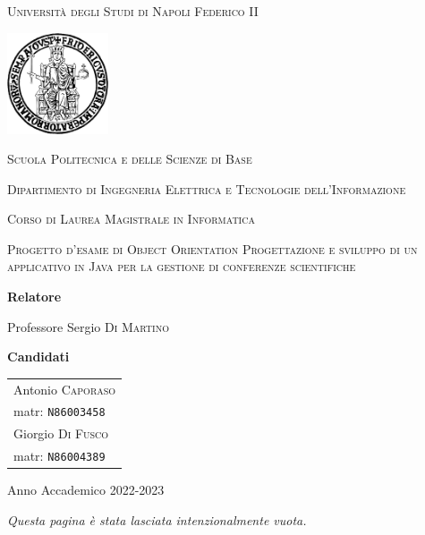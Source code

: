 \documentclass[a4paper, oneside, 10pt]{book}
\begin{document}
\pagestyle{empty}
\begin{titlepage}
	\begin{center}
		\setlength{\parskip}{2ex}
		
		
		\Large\textsc{Università degli Studi di Napoli Federico II}
		
		\includegraphics[width=3cm]{Immagini/logo-federico-II.pdf}
		
		\Large\textsc{Scuola Politecnica e delle Scienze di Base}
		
		\large\textsc{Dipartimento di Ingegneria Elettrica e Tecnologie dell'Informazione}
		
		\large\textsc{Corso di Laurea Magistrale in Informatica}
		
		\textsc{Progetto d'esame di Object Orientation}
		\vfill
		\huge\textsc{Progettazione e sviluppo di un applicativo in Java per la gestione di conferenze scientifiche}
		\vfill
		\begin{minipage}[t]{.49\textwidth}
			\large
			
			\textbf{Relatore}\par
			Professore Sergio \textsc{Di Martino}
		\end{minipage}\hfill
	\begin{minipage}[t]{.45\textwidth}
		\large
		\hspace{3.3cm}\textbf{Candidati}\par
		\hfill\begin{tabular}{l}
			 Antonio \textsc{Caporaso} \\ 
			 matr: \texttt{N86003458} \\
			 Giorgio \textsc{Di Fusco} \\
			  matr: \texttt{N86004389} \\
		 \end{tabular}
	\end{minipage}
\vfill
		
		\large Anno Accademico 2022-2023
	\end{center}
\end{titlepage}

\newpage
\textit{Questa pagina è stata lasciata intenzionalmente vuota.}
\newpage
\tableofcontents
\listoffigures
\listoftables
\end{document}
